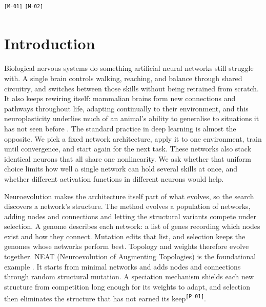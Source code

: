 \documentclass[12pt]{article}
\newcommand{\revID}[1]{\textsuperscript{\scriptsize\texttt{[#1]}}}
\newcommand{\revPlain}[2]{\textcolor{lrGreen}{#2}\revID{#1}}    %
\newcommand{\revMeta}[2]{\textcolor{lrGrey}{#2}\revID{#1}}      %
\begin{document}
\tableofcontents
\revMeta{M-01}{}%
\revMeta{M-02}{}%

\bigskip

\newpage

\newpage

\section{Introduction}
\label{sec:introduction}

Biological nervous systems do something artificial neural networks still struggle with.
A single brain controls walking, reaching, and balance through shared circuitry, and switches between those skills without being retrained from scratch.
It also keeps rewiring itself: mammalian brains form new connections and pathways throughout life, adapting continually to their environment, and this neuroplasticity underlies much of an animal's ability to generalise to situations it has not seen before \parencite{pascual-leone_plastic_2005}.
The standard practice in deep learning is almost the opposite.
We pick a fixed network architecture, apply it to one environment, train until convergence, and start again for the next task.
These networks also stack identical neurons that all share one nonlinearity.
We ask whether that uniform choice limits how well a single network can hold several skills at once, and whether different activation functions in different neurons would help.

Neuroevolution makes the architecture itself part of what evolves, so the search discovers a network's structure.
The method evolves a population of networks, adding nodes and connections and letting the structural variants compete under selection.
A genome describes each network: a list of genes recording which nodes exist and how they connect.
Mutation edits that list, and selection keeps the genomes whose networks perform best.
Topology and weights therefore evolve together.
NEAT (Neuroevolution of Augmenting Topologies) is the foundational example \parencite{stanley_evolving_2002}.
It starts from minimal networks and adds nodes and connections through random structural mutation. A speciation mechanism shields each new structure from competition long enough for its weights to adapt, and selection then eliminates \revPlain{P-01}{the structure that has not earned its keep}.
\end{document}
